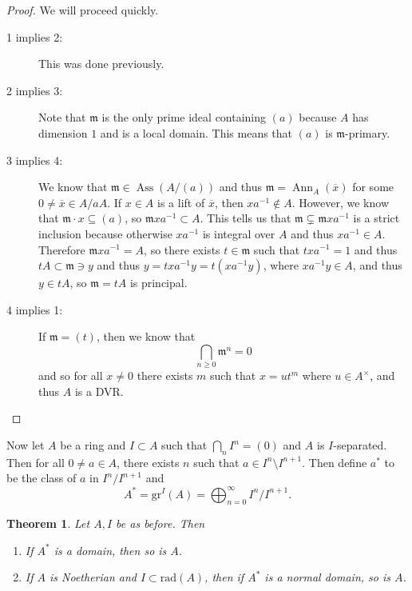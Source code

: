 \documentclass[leqno, openany]{memoir}
\newtheorem{thm}{Theorem}[section]
\theoremstyle{definition}
\theoremstyle{remark}
\theoremstyle{plain}
\theoremstyle{definition}
\theoremstyle{remark}
\newcommand{\mf}[1]{\mathfrak{#1}}
\newcommand{\mr}[1]{\mathrm{#1}}
\newcommand{\ol}[1]{\overline{#1}}
\DeclareMathOperator{\Ann}{Ann}
\DeclareMathOperator{\Ass}{Ass}
\begin{document}
\begin{proof} We will proceed quickly.  \begin{description} \item[1 implies 2:]
    This was done previously.  \item[2 implies 3:] Note that $\mf{m}$ is the
    only prime ideal containing $(a)$ because $A$ has dimension $1$ and is a
    local domain. This means that $(a)$ is $\mf{m}$-primary.  \item[3 implies
    4:] We know that $\mf{m} \in \Ass(A/(a))$ and thus $\mf{m} =
    \Ann_A(\ol{x})$ for some $0 \neq \ol{x} \in A/aA$. If $x \in A$ is a lift
    of $\ol{x}$, then $xa^{-1} \notin A$. However, we know that $\mf{m} \cdot x
    \subseteq (a)$, so $\mf{m}xa^{-1} \subset A$. This tells us that $\mf{m}
    \subsetneq \mf{m} xa^{-1}$ is a strict inclusion because otherwise
    $xa^{-1}$ is integral over $A$ and thus $xa^{-1} \in A$. Therefore $\mf{m}
    xa^{-1} = A$, so there exists $t \in \mf{m}$ such that $txa^{-1} = 1$ and
    thus $tA \subset \mf{m} \ni y$ and thus $y = txa^{-1}y = t(xa^{-1}y)$,
    where $xa^{-1}y \in A$, and thus $y \in tA$, so $\mf{m} = tA$ is principal.
\item[4 implies 1:] If $\mf{m} = (t)$, then we know that \[ \bigcap_{n \geq 0}
    \mf{m}^n = 0 \] and so for all $x \neq 0$ there exists $m$ such that $x = u
    t^m$ where $u \in A^{\times}$, and thus $A$ is a DVR. \qedhere
    \end{description} \end{proof}

Now let $A$ be a ring and $I \subset A$ such that $\bigcap_n I^n = (0)$ and $A$
is $I$-separated. Then for all $0 \neq a \in A$, there exists $n$ such that $a
\in I^n \setminus I^{n+1}$. Then define $a^*$ to be the class of $a$ in $I^n /
I^{n+1}$ and \[ A^* = \mr{gr}^I(A) = \bigoplus_{n=0}^{\infty} I^n / I^{n+1}. \]

\begin{thm} Let $A, I$ be as before. Then \begin{enumerate} \item If $A^*$ is a
domain, then so is $A$.  \item If $A$ is Noetherian and $I \subset
\mr{rad}(A)$, then if $A^*$ is a normal domain, so is $A$.  \end{enumerate}
\end{thm}
\end{document}
